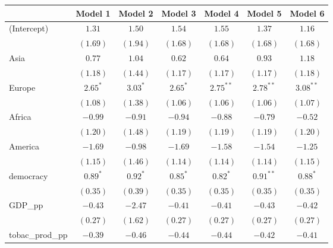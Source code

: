 
\begin{table}[!h]
\begin{center}
\begin{tabular}{l c c c c c c }
\toprule
 & Model 1 & Model 2 & Model 3 & Model 4 & Model 5 & Model 6 \\
\midrule
(Intercept)             & $1.31$       & $1.50$       & $1.54$       & $1.55$       & $1.37$       & $1.16$       \\
                        & $(1.69)$     & $(1.94)$     & $(1.68)$     & $(1.68)$     & $(1.68)$     & $(1.68)$     \\
Asia                    & $0.77$       & $1.04$       & $0.62$       & $0.64$       & $0.93$       & $1.18$       \\
                        & $(1.18)$     & $(1.44)$     & $(1.17)$     & $(1.17)$     & $(1.17)$     & $(1.18)$     \\
Europe                  & $2.65^{*}$   & $3.03^{*}$   & $2.65^{*}$   & $2.75^{**}$  & $2.78^{**}$  & $3.08^{**}$  \\
                        & $(1.08)$     & $(1.38)$     & $(1.06)$     & $(1.06)$     & $(1.06)$     & $(1.07)$     \\
Africa                  & $-0.99$      & $-0.91$      & $-0.94$      & $-0.88$      & $-0.79$      & $-0.52$      \\
                        & $(1.20)$     & $(1.48)$     & $(1.19)$     & $(1.19)$     & $(1.19)$     & $(1.20)$     \\
America                 & $-1.69$      & $-0.98$      & $-1.69$      & $-1.58$      & $-1.54$      & $-1.25$      \\
                        & $(1.15)$     & $(1.46)$     & $(1.14)$     & $(1.14)$     & $(1.14)$     & $(1.15)$     \\
democracy               & $0.89^{*}$   & $0.92^{*}$   & $0.85^{*}$   & $0.82^{*}$   & $0.91^{**}$  & $0.88^{*}$   \\
                        & $(0.35)$     & $(0.39)$     & $(0.35)$     & $(0.35)$     & $(0.35)$     & $(0.35)$     \\
GDP\_pp                 & $-0.43$      & $-2.47$      & $-0.41$      & $-0.41$      & $-0.43$      & $-0.42$      \\
                        & $(0.27)$     & $(1.62)$     & $(0.27)$     & $(0.27)$     & $(0.27)$     & $(0.27)$     \\
tobac\_prod\_pp         & $-0.39$      & $-0.46$      & $-0.44$      & $-0.44$      & $-0.42$      & $-0.41$      \\

\end{tabular}
\end{center}
\end{table}
